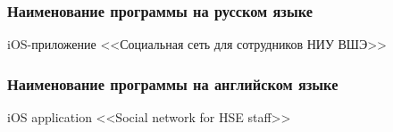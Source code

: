 \subsubsection{Наименование программы на русском языке}
iOS-приложение <<Социальная сеть для сотрудников НИУ ВШЭ>>
\subsubsection{Наименование программы на английском языке}
iOS application <<Social network for HSE staff>>